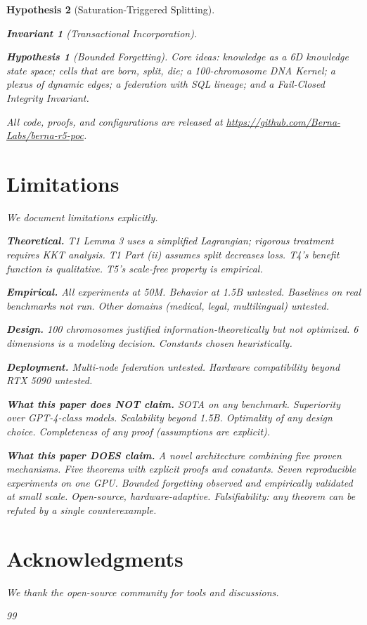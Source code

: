 \documentclass[11pt,a4paper]{article}
\newtheorem{invariant}{Invariant}
\newtheorem{hypothesis}{Hypothesis}
\begin{document}
\begin{hypothesis}[Saturation-Triggered Splitting]
\begin{invariant}[Transactional Incorporation]
\begin{hypothesis}[Bounded Forgetting]
Core ideas: knowledge as a 6D knowledge state space; cells that are born,
split, die; a 100-chromosome DNA Kernel; a plexus of dynamic
edges; a federation with SQL lineage; and a Fail-Closed Integrity Invariant.

All code, proofs, and configurations are released at
\url{https://github.com/Berna-Labs/berna-r5-poc}.

\section{Limitations}
\label{sec:limits}

We document limitations explicitly.

\textbf{Theoretical.} T1 Lemma 3 uses a simplified Lagrangian;
rigorous treatment requires KKT analysis. T1 Part (ii) assumes
split decreases loss. T4's benefit function is qualitative.
T5's scale-free property is empirical.

\textbf{Empirical.} All experiments at 50M. Behavior at 1.5B
untested. Baselines on real benchmarks not run. Other domains
(medical, legal, multilingual) untested.

\textbf{Design.} 100 chromosomes justified information-theoretically
but not optimized. 6 dimensions is a modeling decision.
Constants chosen heuristically.

\textbf{Deployment.} Multi-node federation untested. Hardware
compatibility beyond RTX 5090 untested.

\textbf{What this paper does NOT claim.} SOTA on any benchmark.
Superiority over GPT-4-class models. Scalability beyond 1.5B.
Optimality of any design choice. Completeness of any proof
(assumptions are explicit).

\textbf{What this paper DOES claim.} A novel architecture
combining five proven mechanisms. Five theorems with explicit
proofs and constants. Seven reproducible experiments on one
GPU. Bounded forgetting observed and empirically validated at
small scale. Open-source, hardware-adaptive. Falsifiability:
any theorem can be refuted by a single counterexample.

\section*{Acknowledgments}

We thank the open-source community for tools and discussions.

\begin{thebibliography}{99}


\end{thebibliography}
\end{hypothesis}
\end{invariant}
\end{hypothesis}
\end{document}
